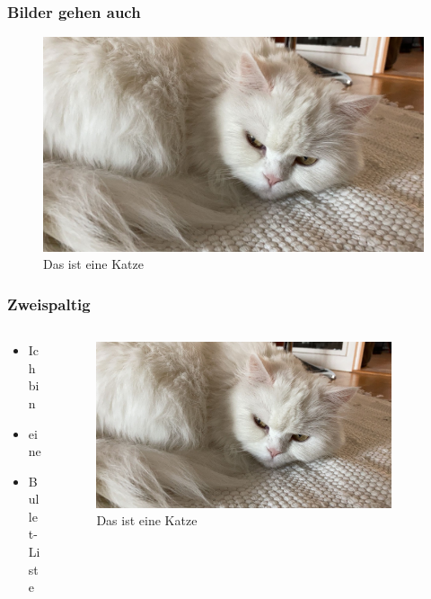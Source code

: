 \documentclass[ngerman]{beamer}
\begin{document}
\begin{frame}
\frametitle{Bilder gehen auch}

\begin{figure}[htb]
	\centering
	\includegraphics[width=\textwidth]{miau.jpg}
	\caption{Das ist eine Katze}\label{fig:mieze2}
\end{figure}

\end{frame}


\begin{frame}
\frametitle{Zweispaltig}

\begin{columns}

\begin{column}{0.33\textwidth}
	\begin{itemize}
		\item Ich bin 
		\item eine 
		\item Bullet-Liste
	\end{itemize}
\end{column}

\begin{column}{0.66\textwidth}
	\begin{figure}[htb]
		\centering
		\includegraphics[width=0.9\textwidth]{miau.jpg}
		\caption{Das ist eine Katze}\label{fig:mieze2}
	\end{figure}
\end{column}

\end{columns}
\end{frame}
\end{document}
